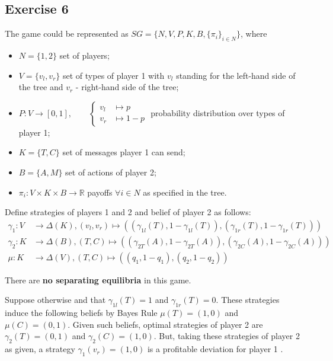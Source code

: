 \documentclass[]{article}
\begin{document}
\subsection*{Exercise 6}

The game could be represented as $SG = \{N, V, P, K, B, \{\pi_i\}_{i\in N}\}$, where
\begin{itemize}[label={}]
	\item $N = \{1, 2\}$ set of players;
	\item $V = \{v_l, v_r\}$ set of types of player 1 with $v_l$ standing for the left-hand side of the tree and $v_r$ - right-hand side of the tree;
	\item $P: V \to [0, 1], \qquad \begin{cases}
		v_l &\mapsto p \\
		v_r &\mapsto 1 - p
	\end{cases}$ probability distribution over types of player 1;
	\item $K = \{T, C\}$ set of messages player 1 can send;
	\item $B = \{A, M\}$ set of actions of player 2;
	\item $\pi_i: V\times K \times B\to \mathbb{R}$ payoffs $\forall i\in N$ as specified in the tree.
\end{itemize}

Define strategies of players 1 and 2 and belief of player 2 as follows:
\begin{equation}
	\begin{split}
		\gamma_1: V &\to \Delta(K), (v_l, v_r) \mapsto ((\gamma_{1l}(T), 1 - \gamma_{1l}(T)), (\gamma_{1r}(T), 1 - \gamma_{1r}(T))) \\
		\gamma_2: K &\to \Delta(B), (T, C) \mapsto ((\gamma_{2T}(A), 1 - \gamma_{2T}(A)), (\gamma_{2C}(A), 1 - \gamma_{2C}(A))) \\
		\mu: K &\to \Delta(V), (T, C) \mapsto ((q_1, 1 - q_1), (q_2, 1 - q_2)) \nonumber
	\end{split}
\end{equation}

There are \textbf{no separating equilibria} in this game.

Suppose otherwise and that $\gamma_{1l}(T) = 1$ and $\gamma_{1r}(T) = 0$. These strategies induce the following beliefs by Bayes Rule $\mu(T) = (1, 0)$ and $\mu(C) = (0, 1)$. Given such beliefs, optimal strategies of player 2 are $\gamma_2(T) = (0, 1)$ and $\gamma_2(C) = (1, 0)$. But, taking these strategies of player 2 as given, a strategy $\gamma_1(v_r) = (1, 0)$ is a profitable deviation for player 1 \Lightning.
\end{document}
